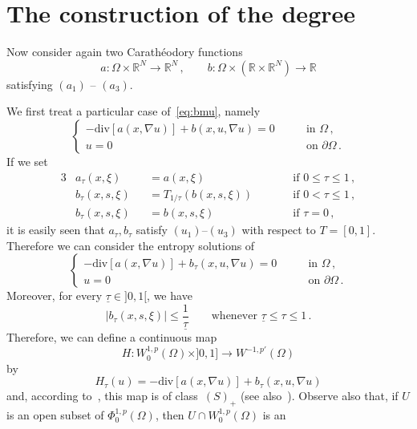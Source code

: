\documentclass[twoside,reqno]{amsart}
\numberwithin{equation}{section}
\theoremstyle{definition}
\newcommand{\R}{\mathbb{R}}
\begin{document}

\section{The construction of the degree}
\label{sect:degreeeq}
%
Now consider again two Carath\'eodory functions
\[
a:\Omega\times\R^N\rightarrow\R^N\,,\qquad
b:\Omega\times(\R\times\R^N)\rightarrow\R
\]
satisfying $(a_1)$ -- $(a_3)$.
\par
We first treat a particular case of~\eqref{eq:bmu}, namely 
\begin{equation}
\label{eq:b0}
\begin{cases}
- \mathrm{div}[a(x,\nabla u)] + b(x,u,\nabla u)=0
&\qquad\text{in $\Omega$}\,,\\
u=0
&\qquad\text{on $\partial\Omega$}\,.
\end{cases}
\end{equation}
If we set
\begin{alignat*}{3}
& a_{\tau}(x,\xi) &&= a(x,\xi)
&&\qquad\text{if $0\leq \tau\leq 1$}\,,\\
& b_{\tau}(x,s,\xi) &&= 
T_{1/\tau}\left(b(x,s,\xi)\right)
&&\qquad\text{if $0<\tau\leq 1$}\,,\\
& b_{\tau}(x,s,\xi) &&=
b(x,s,\xi)
&&\qquad\text{if $\tau=0$}\,,
\end{alignat*}
it is easily seen that $a_\tau, b_\tau$ satisfy
$(u_1)$--$(u_3)$ with respect to $T=[0,1]$.
Therefore we can consider the entropy solutions of
\begin{equation}
\label{eq:entropytau}
\begin{cases}
- \mathrm{div}[a(x,\nabla u)] + b_\tau(x,u,\nabla u)=0 
&\qquad\text{in $\Omega$}\,,\\
u=0
&\qquad\text{on $\partial\Omega$}\,.
\end{cases}
\end{equation}
Moreover, for every $\underline{\tau}\in]0,1[$, we have
\[
|b_\tau(x,s,\xi)| \leq \frac{1}{\underline{\tau}}
\qquad\text{whenever $\underline{\tau}\leq \tau\leq 1$}\,.
\]
Therefore, we can define a continuous map
\[
H:W^{1,p}_0(\Omega)\times ]0,1]\rightarrow W^{-1,p'}(\Omega)
\]
by
\[
H_\tau(u) = - \mathrm{div}\left[a(x,\nabla u)\right]
+ b_\tau(x,u,\nabla u)
\]
and, according
to~\cite{browder1983, skrypnik1994}, 
this map is of class~$(S)_+$
(see also~\cite[Theorem~3.5]{almi_degiovanni2013}).
Observe also that, if $U$ is an open subset of 
$\Phi^{1,p}_0(\Omega)$, then $U\cap W^{1,p}_0(\Omega)$ is an 
\end{document}
